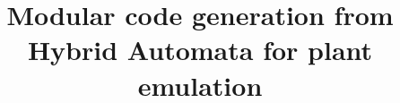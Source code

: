 \documentclass[conference]{IEEEtran}
\begin{document}
	
\title{Modular code generation from Hybrid Automata for plant emulation }

\author{}




\maketitle


\begin{abstract}

\end{abstract}













 
\end{document}
